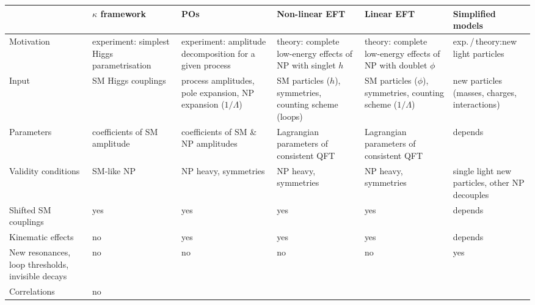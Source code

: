 \begin{table}
  \renewcommand{\arraystretch}{1.8}
  \footnotesize
  \begin{tabularx}{\textwidth}{LLLLLL} 
    \toprule 
    & $\kappa$ framework & POs & Non-linear EFT & Linear EFT & Simplified models \\
    \midrule
    Motivation & 
    experiment: \newline simplest Higgs parametrisation &
    experiment: \newline amplitude decomposition for a given process &
    theory: \newline complete low-energy effects of NP with singlet $h$& 
    theory: \newline complete low-energy effects of NP with doublet $\phi$ &
    exp.\,/\,theory:\newline new light particles \\
    Input & 
    SM Higgs couplings &
    process amplitudes, \newline pole expansion,  \newline NP expansion ($1/\Lambda $)&
    SM particles ($h$), \newline symmetries, \newline counting scheme (loops) & 
    SM particles ($\phi$), \newline symmetries, \newline counting scheme ($1/\Lambda $) & 
    new particles (masses, charges, interactions) \\
    Parameters & 
    coefficients of SM amplitude &
    coefficients of SM \& NP amplitudes &
    Lagrangian parameters of consistent QFT & 
    Lagrangian parameters of consistent QFT &
    depends \\
    Validity conditions & 
    SM-like NP &
    NP heavy, symmetries &
    NP heavy, symmetries & 
    NP heavy, symmetries &
    single light new particles, other NP decouples \\
    \midrule 
    Shifted SM couplings & 
    yes &
    yes &
    yes & 
    yes &
    depends \\
    Kinematic effects & 
    no &
    yes &
    yes & 
    yes &
    depends \\
    New resonances, \newline loop thresholds, \newline invisible decays & 
    no &
    no &
    no & 
    no &
    yes \\
    Correlations & 
    no &

\end{tabularx}
\end{table}
